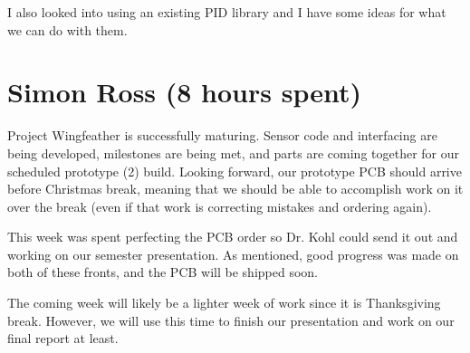 \documentclass[12pt, titlepage]{article}
\begin{document}
I also looked into using an existing PID library and I have some ideas for what we can do with them. 

\section*{Simon Ross (8 hours spent)}

Project Wingfeather is successfully maturing. Sensor code and interfacing are being developed, milestones are being met, and parts are coming together for our scheduled prototype (2) build. Looking forward, our prototype PCB should arrive before Christmas break, meaning that we should be able to accomplish work on it over the break (even if that work is correcting mistakes and ordering again).

This week was spent perfecting the PCB order so Dr. Kohl could send it out and working on our semester presentation.  As mentioned, good progress was made on both of these fronts, and the PCB will be shipped soon.

The coming week will likely be a lighter week of work since it is Thanksgiving break. However, we will use this time to finish our presentation and work on our final report at least.
\end{document}

